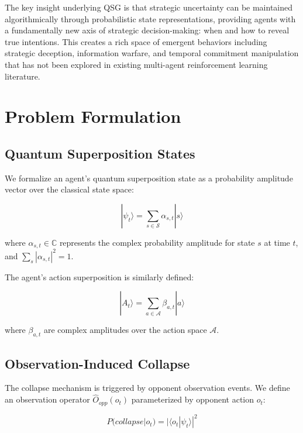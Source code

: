 \documentclass[11pt,a4paper]{article}
\begin{document}
The key insight underlying QSG is that strategic uncertainty can be maintained algorithmically through probabilistic state representations, providing agents with a fundamentally new axis of strategic decision-making: when and how to reveal true intentions. This creates a rich space of emergent behaviors including strategic deception, information warfare, and temporal commitment manipulation that has not been explored in existing multi-agent reinforcement learning literature.

\section{Problem Formulation}

\subsection{Quantum Superposition States}

We formalize an agent's quantum superposition state as a probability amplitude vector over the classical state space:

\begin{equation}
|\psi_t\rangle = \sum_{s \in \mathcal{S}} \alpha_{s,t} |s\rangle
\end{equation}

where $\alpha_{s,t} \in \mathbb{C}$ represents the complex probability amplitude for state $s$ at time $t$, and $\sum_{s} |\alpha_{s,t}|^2 = 1$.

The agent's action superposition is similarly defined:

\begin{equation}
|A_t\rangle = \sum_{a \in \mathcal{A}} \beta_{a,t} |a\rangle
\end{equation}

where $\beta_{a,t}$ are complex amplitudes over the action space $\mathcal{A}$.

\subsection{Observation-Induced Collapse}

The collapse mechanism is triggered by opponent observation events. We define an observation operator $\hat{O}_{opp}(o_t)$ parameterized by opponent action $o_t$:

\begin{equation}
P(collapse|o_t) = |\langle o_t | \psi_t \rangle|^2
\end{equation}
\end{document}
